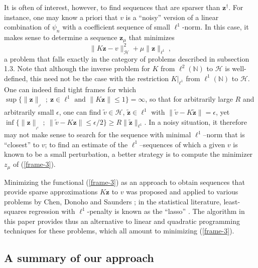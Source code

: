 \documentclass[10pt]{article}
\def\N{\mathbb{N}}
\def\cH{\mathcal{H}}
\newcommand\eref[1]{(\ref{#1})}
\begin{document}
It is often of interest, however,
to find sequences
that are sparser than $\mathbf{z}^{\dagger}$.
For instance, one may know a priori that $v$ is a ``noisy'' version
of a linear combination of $\psi_n$ with a coefficient sequence of small
$\ell^1$-norm. In this case, it makes sense to determine a sequence
$\mathbf{z}_{\mu}$ that minimizes
\begin{equation}
\label{frame-3}
\|K\mathbf{z}-v\|^2_{\cH} + \mu \|{\mathbf{z}}\|_{\ell^1} ~,
\end{equation}
a problem that
falls exactly in the category of problems described in subsection 1.3.
Note that although the inverse problem for $K$ from $\ell^2(\N)$ to $\cH$
is well-defined, this need not be the case with the restriction
$K \big|_{\ell^1}$ from $\ell^1(\N)$ to $\cH$. One can indeed find
tight frames for which
$\sup \{ \|\mathbf{z}\|_{_{\ell^1}}~;~ \mathbf{z} \in \ell^1 \mbox{ and }
\|K\mathbf{z}\| \leq 1 \} = \infty$,
so that for arbitrarily large $R$ and arbitrarily small $\epsilon$,
one can find $\tilde{v} \in \cH$, $\tilde{\mathbf{z}} \in \ell^1$
with $\|\tilde{v}-K\tilde{\mathbf{z}}\| = \epsilon$, yet
$\inf \{ \|\mathbf{z}\|_{_{\ell^1}} ~; ~ \|\tilde{v}-K{\mathbf{z}} \|
\leq \epsilon/2 \} \geq R \|\tilde{\mathbf{z}}\|_{\ell^1}$.
In a noisy situation, it therefore may not make sense to search for the
sequence
with minimal $\ell^1$--norm that is ``closest'' to $v$; to find
an estimate of the $\ell^1$--sequences of which a given $v$ is known
to be a small perturbation, a better strategy is to compute the minimizer
$z_{\mu}$ of  \eref{frame-3}.

Minimizing the functional \eref{frame-3} as an approach to obtain
sequences that provide sparse approximations $K\mathbf{z}$
to $v$ was
proposed and applied to various problems by Chen, Donoho and Saunders
\cite{CDS01};
in the statistical literature, least-squares regression with
$\ell^1$-penalty is known as the ``lasso'' \cite{Tib96}.
The algorithm in this paper provides thus an alternative to linear and
quadratic programming techniques for these problems,
which all amount to minimizing  \eref{frame-3}.


\subsection{A summary of our approach}
\end{document}
